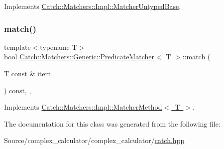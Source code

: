 Implements \mbox{\hyperlink{class_catch_1_1_matchers_1_1_impl_1_1_matcher_untyped_base_a91d3a907dbfcbb596077df24f6e11fe2}{Catch\+::\+Matchers\+::\+Impl\+::\+Matcher\+Untyped\+Base}}.

\mbox{\label{class_catch_1_1_matchers_1_1_generic_1_1_predicate_matcher_a2ec0e8ec19c4c5e26271d59a06a62b52}} 
\subsubsection{\texorpdfstring{match()}{match()}}
{\footnotesize\ttfamily template$<$typename T$>$ \\
bool \mbox{\hyperlink{class_catch_1_1_matchers_1_1_generic_1_1_predicate_matcher}{Catch\+::\+Matchers\+::\+Generic\+::\+Predicate\+Matcher}}$<$ T $>$\+::match (\begin{DoxyParamCaption}\item[{T const \&}]{item }\end{DoxyParamCaption}) const\hspace{0.3cm}{\ttfamily [inline]}, {\ttfamily [override]}, {\ttfamily [virtual]}}



Implements \mbox{\hyperlink{struct_catch_1_1_matchers_1_1_impl_1_1_matcher_method_ae0920ff9e817acf08e1bb0cbcb044e30}{Catch\+::\+Matchers\+::\+Impl\+::\+Matcher\+Method$<$ T $>$}}.



The documentation for this class was generated from the following file\+:\begin{DoxyCompactItemize}
\item 
Source/complex\+\_\+calculator/complex\+\_\+calculator/\mbox{\hyperlink{catch_8hpp}{catch.\+hpp}}\end{DoxyCompactItemize}
